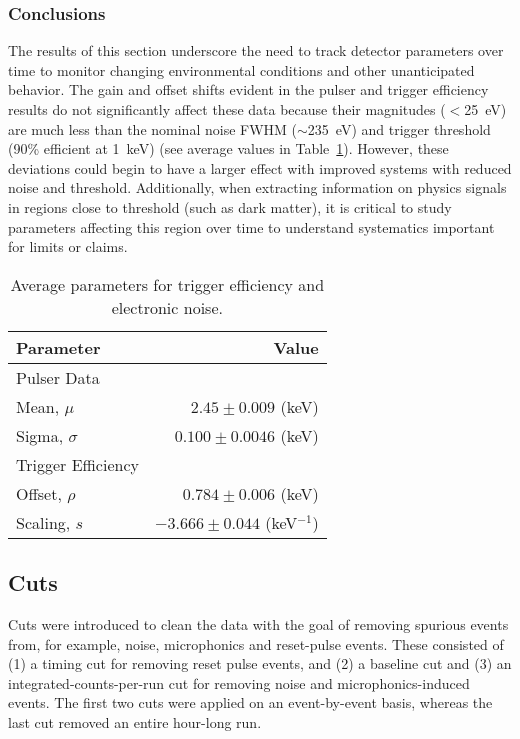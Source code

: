 	    	\subsubsection{Conclusions}
		\label{sec:DeploymentPPC2SoudanAnalysisParsTimeConclusion}    	
	
	The results of this section underscore the need to track detector parameters over time to monitor changing environmental conditions and other unanticipated behavior.  The gain and offset shifts evident in the pulser and trigger efficiency results do not significantly affect these data because their magnitudes ($<$25~eV) are much less than the nominal noise FWHM ($\sim$235~eV) and trigger threshold (90\% efficient at 1~keV) (see average values in Table~\ref{tab:PPC2AvgPars}).  However, these deviations could begin to have a larger effect with improved systems with reduced noise and threshold.  Additionally, when extracting information on physics signals in regions close to threshold (such as dark matter), it is critical to study parameters affecting this region over time to understand systematics important for limits or claims.  
	
				\begin{table}
					\centering
					\begin{tabular}{l|r}
						Parameter & Value \\
						\hline
						    Pulser Data 	  \\
						    Mean, $\mu$ &  $2.45\pm0.009$ (keV) \\
						    Sigma, $\sigma$ &  $0.100\pm0.0046$ (keV) \\						    
						    Trigger Efficiency 	  \\
						    Offset, $\rho$ &  $0.784\pm0.006$ (keV) \\
						    Scaling, $s$ &  $-3.666\pm0.044$ (keV$^{-1}$) \\						    						    
						\hline
					\end{tabular}
					\caption[Average parameters for trigger efficiency and electronic noise]
					{Average parameters for trigger efficiency and electronic noise.}
					\label{tab:PPC2AvgPars}
				\end{table}	
	    	\subsection{Cuts}
		\label{sec:DeploymentPPC2SoudanAnalysisCuts}    
			
	Cuts were introduced to clean the data with the goal of removing spurious events from, for example, noise, microphonics and reset-pulse events.  These consisted of (1) a timing cut for removing reset pulse events, and (2) a baseline cut and (3) an integrated-counts-per-run cut for removing noise and microphonics-induced events.  The first two cuts were applied on an event-by-event basis, whereas the last cut removed an entire hour-long run. 
	
